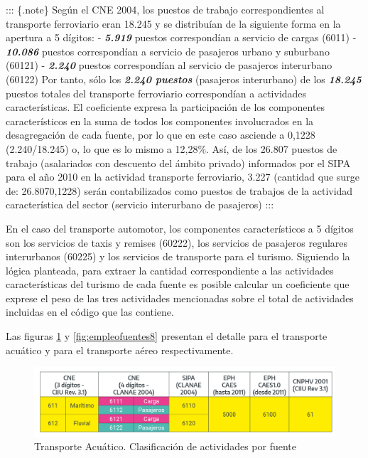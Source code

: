 \documentclass[
  openany]{book}
\begin{document}
::: \{.note\} Según el CNE 2004, los puestos de trabajo correspondientes al transporte ferroviario eran 18.245 y se distribuían de la siguiente forma en la apertura a 5 dígitos: - \textbf{\emph{5.919}} puestos correspondían a servicio de cargas (6011) - \textbf{\emph{10.086}} puestos correspondían a servicio de pasajeros urbano y suburbano (60121) - \textbf{\emph{2.240}} puestos correspondían al servicio de pasajeros interurbano (60122) Por tanto, sólo los \textbf{\emph{2.240 puestos}} (pasajeros interurbano) de los \textbf{\emph{18.245}} puestos totales del transporte ferroviario correspondían a actividades características.
El coeficiente expresa la participación de los componentes característicos en la suma de todos los componentes involucrados en la desagregación de cada fuente, por lo que en este caso asciende a 0,1228 (2.240/18.245) o, lo que es lo mismo a 12,28\%.
Así, de los 26.807 puestos de trabajo (asalariados con descuento del ámbito privado) informados por el SIPA para el año 2010 en la actividad transporte ferroviario, 3.227 (cantidad que surge de: 26.8070,1228) serán contabilizados como puestos de trabajos de la actividad característica del sector (servicio interurbano de pasajeros)
:::

En el caso del transporte automotor, los componentes característicos a 5 dígitos son los servicios de taxis y remises (60222), los servicios de pasajeros regulares interurbanos (60225) y los servicios de transporte para el turismo. Siguiendo la lógica planteada, para extraer la cantidad correspondiente a las actividades características del turismo de cada fuente es posible calcular un coeficiente que exprese el peso de las tres actividades mencionadas sobre el total de actividades incluidas en el código que las contiene.

Las figuras \ref{fig:empleofuentes7} y \ref{fig:empleofuentes8} presentan el detalle para el transporte acuático y para el transporte aéreo respectivamente.

\begin{figure}

{\centering \includegraphics[width=0.8\linewidth]{imagenes/figura3.7} 

}

\caption{Transporte Acuático. Clasificación de actividades por fuente}\label{fig:empleofuentes7}
\end{figure}
\end{document}
